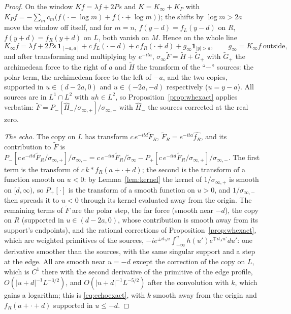 \documentclass[11pt]{article}
\theoremstyle{definition}
\theoremstyle{remark}
\begin{document}
\begin{proof}
On the window $Kf=\lambda f+2Ps$ and $K=K_\infty+K_P$ with $K_Pf=-\sum_mc_m\big(f(\cdot-\log m)+f(\cdot+\log m)\big)$; the shifts by $\log m>2a$ move the window off itself, and for $m=n$, $f(y-d)=f_L(y-d)$ on $R$, $f(y+d)=f_R(y+d)$ on $L$, both vanish on $M$. Hence on the whole line
\[
K_\infty f=\lambda f+2Ps\,\mathbf 1_{[-a,a]}+c\,f_L(\cdot-d)+c\,f_R(\cdot+d)+g_\infty\mathbf 1_{|y|>a},\qquad g_\infty=K_\infty f\ \text{outside},
\]
and after transforming and multiplying by $e^{-ita}$, $\sigma_\infty\tilde F=\tilde H+\tilde G_+$ with $\tilde G_+$ the archimedean force to the right of $a$ and $\tilde H$ the transform of the ``$-$'' sources: the polar term, the archimedean force to the left of $-a$, and the two copies, supported in $u\in(d-2a,0)$ and $u\in(-2a,-d)$ respectively ($u=y-a$). All sources are in $L^1\cap L^2$ with $uh\in L^2$, so Proposition~\ref{prop:whexact} applies verbatim: $\tilde F=P_-[\hat H_-/\sigma_{\infty,+}]/\sigma_{\infty,-}$ with $\hat H_-$ the sources corrected at the real zero.

\emph{The echo.} The copy on $L$ has transform $c\,e^{-itd}\tilde F_R$, $\tilde F_R=e^{-ita}\widehat{f_R}$, and its contribution to $\tilde F$ is $P_-[c\,e^{-itd}\tilde F_R/\sigma_{\infty,+}]/\sigma_{\infty,-}=c\,e^{-itd}\tilde F_R/\tilde\sigma_\infty-P_+[c\,e^{-itd}\tilde F_R/\sigma_{\infty,+}]/\sigma_{\infty,-}$. The first term is the transform of $c\,k*f_R(a+\cdot+d)$; the second is the transform of a function smooth on $u<0$: by Lemma~\ref{lem:kernel} the kernel of $1/\sigma_{\infty,+}$ is smooth on $[d,\infty)$, so $P_+[\cdot]$ is the transform of a smooth function on $u>0$, and $1/\sigma_{\infty,-}$ then spreads it to $u<0$ through its kernel evaluated away from the origin. The remaining terms of $\tilde F$ are the polar step, the far force (smooth near $-d$), the copy on $R$ (supported in $u\in(d-2a,0)$, whose contribution is smooth away from its support's endpoints), and the rational corrections of Proposition~\ref{prop:whexact}, which are weighted primitives of the sources, $-ie^{\pm it_\lambda u}\int_{-\infty}^uh(u')e^{\mp it_\lambda u'}du'$: one derivative smoother than the sources, with the same singular support and a step at the edge. All are smooth near $u=-d$ except the correction of the copy on $L$, which is $C^1$ there with the second derivative of the primitive of the edge profile, $O(|u+d|^{-1}L^{-3/2})$, and $O(|u+d|^{-1}L^{-5/2})$ after the convolution with $k$, which gains a logarithm; this is \eqref{eq:echoexact}, with $k$ smooth away from the origin and $f_R(a+\cdot+d)$ supported in $u\le-d$.


\end{proof}
\end{document}
